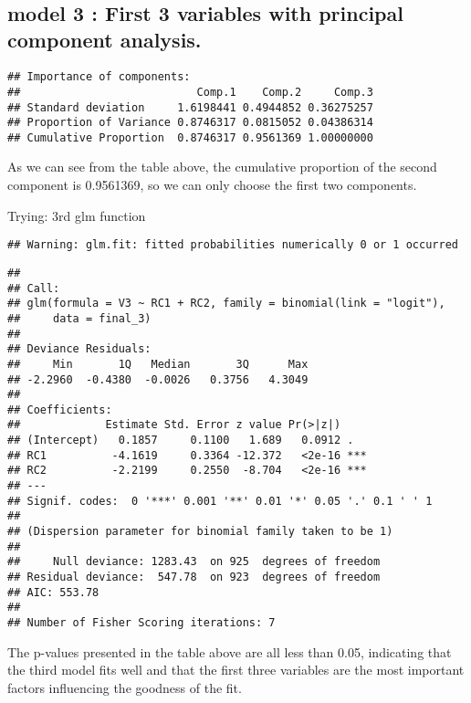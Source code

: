 \documentclass[
]{article}
\begin{document}
~

\hypertarget{model-3-first-3-variables-with-principal-component-analysis.}{%
\subsection{model 3 : First 3 variables with principal component
analysis.}\label{model-3-first-3-variables-with-principal-component-analysis.}}

\begin{verbatim}
## Importance of components:
##                           Comp.1    Comp.2     Comp.3
## Standard deviation     1.6198441 0.4944852 0.36275257
## Proportion of Variance 0.8746317 0.0815052 0.04386314
## Cumulative Proportion  0.8746317 0.9561369 1.00000000
\end{verbatim}

As we can see from the table above, the cumulative proportion of the
second component is 0.9561369, so we can only choose the first two
components.

Trying: 3rd glm function

\begin{verbatim}
## Warning: glm.fit: fitted probabilities numerically 0 or 1 occurred
\end{verbatim}

\begin{verbatim}
## 
## Call:
## glm(formula = V3 ~ RC1 + RC2, family = binomial(link = "logit"), 
##     data = final_3)
## 
## Deviance Residuals: 
##     Min       1Q   Median       3Q      Max  
## -2.2960  -0.4380  -0.0026   0.3756   4.3049  
## 
## Coefficients:
##             Estimate Std. Error z value Pr(>|z|)    
## (Intercept)   0.1857     0.1100   1.689   0.0912 .  
## RC1          -4.1619     0.3364 -12.372   <2e-16 ***
## RC2          -2.2199     0.2550  -8.704   <2e-16 ***
## ---
## Signif. codes:  0 '***' 0.001 '**' 0.01 '*' 0.05 '.' 0.1 ' ' 1
## 
## (Dispersion parameter for binomial family taken to be 1)
## 
##     Null deviance: 1283.43  on 925  degrees of freedom
## Residual deviance:  547.78  on 923  degrees of freedom
## AIC: 553.78
## 
## Number of Fisher Scoring iterations: 7
\end{verbatim}

The p-values presented in the table above are all less than 0.05,
indicating that the third model fits well and that the first three
variables are the most important factors influencing the goodness of the
fit.
\end{document}
